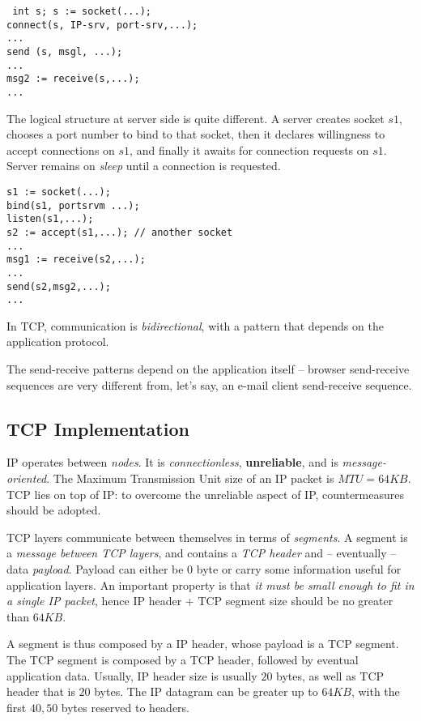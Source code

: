 \documentclass[a4paper, 12pt]{report}
\begin{document}
\begin{verbatim} int s; s := socket(...); 
connect(s, IP-srv, port-srv,...); 
...
send (s, msgl, ...); 
... 
msg2 := receive(s,...); 
... 
\end{verbatim}

The logical structure at server side is quite different. A server creates
socket $s1$, chooses a port number to bind to that socket, then it declares
willingness to accept connections on $s1$, and finally it awaits for connection
requests on $s1$. Server remains on \emph{sleep} until a connection is
requested.

\begin{verbatim} 
s1 := socket(...);
bind(s1, portsrvm ...);
listen(s1,...);
s2 := accept(s1,...); // another socket 
... 
msg1 := receive(s2,...);
...
send(s2,msg2,...);
... 
\end{verbatim}

In TCP, communication is \emph{bidirectional}, with a pattern that depends on
the application protocol.

The send-receive patterns depend on the application itself \--- browser
send-receive sequences are very different from, let's say, an e-mail client
send-receive sequence.

\subsection{TCP Implementation}

IP operates between \emph{nodes}. It is \emph{connectionless},
\textbf{unreliable}, and is \emph{message-oriented}. The Maximum Transmission
Unit size of an IP packet is $MTU = 64KB$. TCP lies on top of IP: to overcome
the unreliable aspect of IP, countermeasures should be adopted.

TCP layers communicate between themselves in terms of \emph{segments}. A
segment is a \emph{message between TCP layers}, and contains a \emph{TCP
header} and \--- eventually \--- data \emph{payload}. Payload can either be $0$
byte or carry some information useful for application layers. An important
property is that \emph{it must be small enough to fit in a single IP packet},
hence IP header + TCP segment size should be no greater than $64KB$.

A segment is thus composed by a IP header, whose payload is a TCP segment. The
TCP segment is composed by a TCP header, followed by eventual application data.
Usually, IP header size is usually $20$ bytes, as well as TCP header that is
$20$ bytes. The IP datagram can be greater up to $64KB$, with the first $40,50$
bytes reserved to headers.
\end{document}
